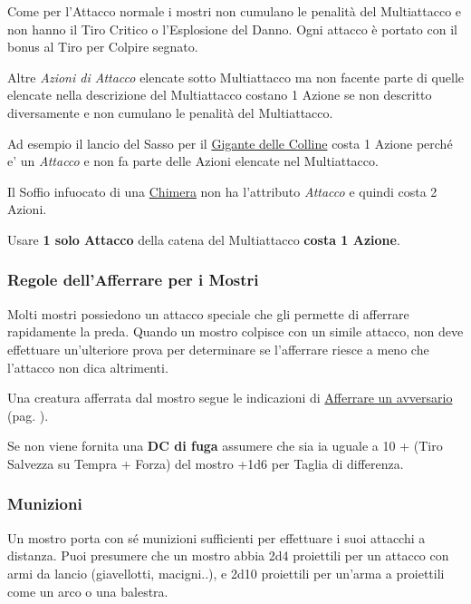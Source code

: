 \begin{multicols}{2}
Come per l'Attacco normale i mostri non cumulano le penalità del Multiattacco e non hanno il Tiro Critico o l'Esplosione del Danno. Ogni attacco è portato con il bonus al Tiro per Colpire segnato.

Altre \emph{Azioni di Attacco} elencate sotto Multiattacco ma non facente parte di quelle elencate nella descrizione del Multiattacco costano 1 Azione se non descritto diversamente e non cumulano le penalità del Multiattacco.

Ad esempio il lancio del Sasso per il \hyperlink{Gigante delle Colline}{Gigante delle Colline} costa 1 Azione perché e' un \emph{Attacco} e non fa parte delle Azioni elencate nel Multiattacco.

Il Soffio infuocato di una \hyperlink{Chimera}{Chimera} non ha l'attributo \emph{Attacco} e quindi costa 2 Azioni.

Usare \textbf{1 solo Attacco} della catena del Multiattacco \textbf{costa 1 Azione}.

\subsubsection{Regole dell'Afferrare per i Mostri}

Molti mostri possiedono un attacco speciale che gli permette di afferrare rapidamente la preda. Quando un mostro colpisce con un simile attacco, non deve effettuare un'ulteriore prova per determinare se l'afferrare riesce a meno che l'attacco non dica altrimenti.

Una creatura afferrata dal mostro segue le indicazioni di \hyperlink{afferrareunavversario}{Afferrare un avversario} (pag. \pageref{afferrareunavversario}).

Se non viene fornita una \textbf{DC di fuga} assumere che sia ia uguale a 10 + (Tiro Salvezza su Tempra  + Forza) del mostro +1d6 per Taglia di differenza.

\subsubsection{Munizioni}

Un mostro porta con sé munizioni sufficienti per effettuare i suoi attacchi a distanza. Puoi presumere che un mostro abbia 2d4 proiettili per un attacco con armi da lancio (giavellotti, macigni..), e 2d10 proiettili per un'arma a proiettili come un arco o una balestra.



\end{multicols}
